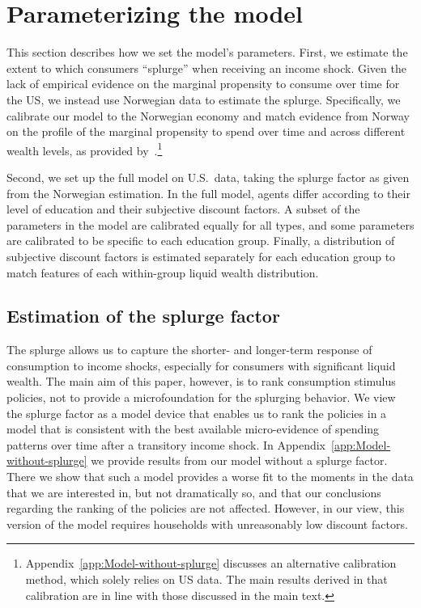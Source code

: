 \documentclass[\latexroot/\projectname]{subfiles}
\begin{document}
\section{Parameterizing the model}
\whenintegrated{\label{sec:parameters}}

This section describes how we set the model's parameters. First, we estimate the extent to which consumers ``splurge'' when receiving an income shock. Given the lack of empirical evidence on the marginal propensity to consume over time for the US, we instead use Norwegian data to estimate the splurge. Specifically, we calibrate our model to the Norwegian economy and match evidence from Norway on the profile of the marginal propensity to spend over time and across different wealth levels, as provided by~\cite{fagereng-mpc-2021}.\footnote{Appendix~\ref{app:Model-without-splurge} discusses an alternative calibration method, which solely relies on US data. The main results derived in that calibration are in line with those discussed in the main text.}

Second, we set up the full model on U.S.\ data, taking the splurge factor as given from the Norwegian estimation. In the full model, agents differ according to their level of education and their subjective discount factors. A subset of the parameters in the model are calibrated equally for all types, and some parameters are calibrated to be specific to each education group. Finally, a distribution of subjective discount factors is estimated separately for each education group to match features of each within-group liquid wealth distribution.

\subsection{Estimation of the splurge factor}
\whenintegrated{\label{sec:splurge}}

The splurge allows us to capture the shorter- and longer-term response of consumption to income shocks, especially for consumers with significant liquid wealth. The main aim of this paper, however, is to rank consumption stimulus policies, not to provide a microfoundation for the splurging behavior. We view the splurge factor as a model device that enables us to rank the policies in a model that is consistent with the best available micro-evidence of spending patterns over time after a transitory income shock. In Appendix~\ref{app:Model-without-splurge} we provide results from our model without a splurge factor. There we show that such a model provides a worse fit to the moments in the data that we are interested in, but not dramatically so, and that our conclusions regarding the ranking of the policies are not affected. However, in our view, this version of the model requires households with unreasonably low discount factors.
\end{document}
